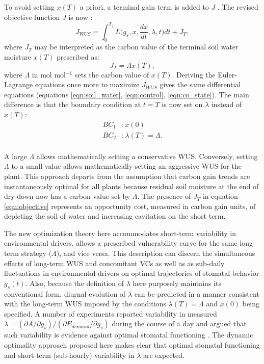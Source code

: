 \documentclass[utf8]{frontiersSCNS} %
\begin{document}
To avoid setting $x(T)$ a priori, a terminal gain term is added to $J$ \citep{manzoni_optimization_2013}. The revised objective function $J$ is now :
\begin{equation}
    \label{eqn:objective}
    J_{WUS} = \int_0^{T_f} L\Big(g_s, x, \frac{dx}{dt},\lambda,t \Big) dt + J_{T},
\end{equation}
where $J_{T}$ may be interpreted as the carbon value of the terminal soil water moisture $x(T)$ prescribed as:
\begin{equation}
    \label{eqn:terminal_gain}
    J_{T} = \Lambda x(T),
\end{equation}
where $\Lambda$ in mol mol$^{-1}$ sets the carbon value of $x(T)$. Deriving the Euler-Lagrange equations once more to maximize $J_{WUS}$ gives the same differential equations (equations \ref{eqn:soil_water}, \ref{eqn:control}, \ref{eqn:co_state}). The main difference is that the boundary condition at $t=T$ is now set on $\lambda$ instead of $x(T)$: 
\begin{equation}
\label{eqn: BC_WUS}
    \begin{split}
        BC_1 &:x(0)\\
        BC_2 &:\lambda(T) = \Lambda.\\
    \end{split}
\end{equation}

A large $\Lambda$ allows mathematically setting a conservative WUS.  Conversely, setting $\Lambda$ to a small value allows mathematically setting an aggressive WUS for the plant. This approach departs from the assumption that carbon gain trends are instantaneously optimal for all plants because residual soil moisture at the end of dry-down now has a carbon value set by $\Lambda$. The presence of $J_{T}$ in equation \ref{eqn:objective} represents an opportunity cost, measured in carbon gain units, of depleting the soil of water and increasing cavitation on the short term.

The new optimization theory here accommodates short-term variability in environmental drivers, allows a prescribed vulnerability curve for the same long-term strategy ($\Lambda$), and vice versa. This description can discern the simultaneous effects of long-term WUS and concomitant VCs as well as as sub-daily fluctuations in environmental drivers on optimal trajectories of stomatal behavior $g_s(t)$.  Also, because the definition of $\lambda$ here purposely maintains its conventional form, diurnal evolution of $\lambda$ can be predicted in a manner consistent with the long-term WUS imposed by the conditions $\lambda(T)=\Lambda$ and $x(0)$ being specified.  A number of experiments reported variability in measured $\lambda=(\partial A/\partial g_s)/(\partial E_{demand}/\partial g_s)$ during the course of a day and argued that such variability is evidence against optimal stomatal functioning \citep{fites1988co2}.  The dynamic optimality approach proposed here makes clear that optimal stomatal functioning and short-term (sub-hourly) variability in $\lambda$ are expected.
\end{document}

